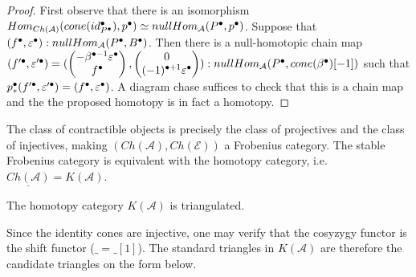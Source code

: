 \begin{proof}
        First observe that there is an isomorphism $Hom_{Ch(\mathcal{A})}(cone(id_{P^{\bullet}}^{\bullet}),p^{\bullet})\simeq nullHom_{\mathcal{A}}(P^{\bullet},p^{\bullet})$. Suppose that $(f^{\bullet},\varepsilon^{\bullet}):nullHom_{\mathcal{A}}(P^{\bullet},B^{\bullet})$. Then there is a null-homotopic chain map $(f'^{\bullet},\varepsilon '^{\bullet})=(\begin{pmatrix} -\beta^{\bullet - 1}\varepsilon^{\bullet} \\ f^{\bullet} \end{pmatrix}, \begin{pmatrix} 0 \\ (-1)^{\bullet + 1}\varepsilon^{\bullet} \end{pmatrix}):nullHom_{\mathcal{A}}(P^{\bullet},cone(\beta^{\bullet})[-1])$ such that \\ $p^{\bullet}_*(f'^{\bullet},\varepsilon '^{\bullet})=(f^{\bullet},\varepsilon^{\bullet})$. A diagram chase suffices to check that this is a chain map and the the proposed homotopy is in fact a homotopy.
    \end{proof}

    \begin{corollary}
        The class of contractible objects is precisely the class of projectives and the class of injectives, making $(Ch(\mathcal{A}),Ch(\mathcal{E}))$ a Frobenius category. The stable Frobenius category is equivalent with the homotopy category, i.e. $\underline{Ch(\mathcal{A})}=K(\mathcal{A})$. 
    \end{corollary}

    \begin{corollary}
        The homotopy category $K(\mathcal{A})$ is triangulated.
    \end{corollary}

    Since the identity cones are injective, one may verify that the cosyzygy functor is the shift functor (\upside{$\Omega$}$\_=\_[1]$). The standard triangles in $K(\mathcal{A})$ are therefore the candidate triangles on the form below.
    \begin{center}
    \end{center}

